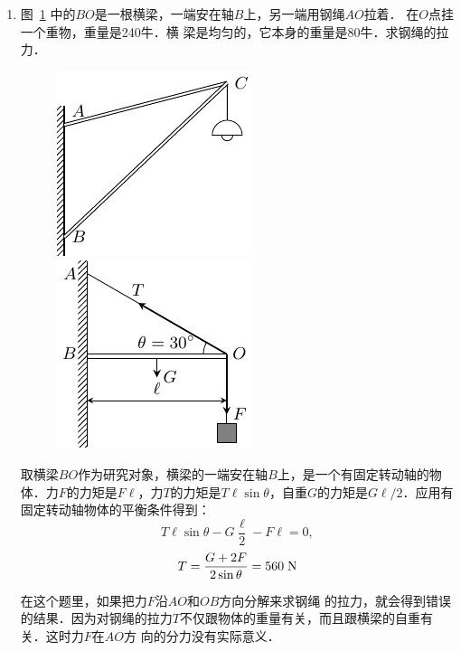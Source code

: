 \begin{enumerate}
\item 图~\ref{fig_A_6-24} 中的$BO$是一根横梁，一端安在轴$B$上，另一端用钢绳$AO$拉着．
在$O$点挂一个重物，重量是240牛．横
梁是均匀的，它本身的重量是80牛．求钢绳的拉力．

\begin{figure}[htbp]
    \centering
    \begin{minipage}[t]{0.4\textwidth}
        \centering
        \includegraphics{fig/A/6-23.pdf}
        \caption{}\label{fig_A_6-23}
    \end{minipage}
    \hfil
    \begin{minipage}[t]{0.4\textwidth}
        \centering
        \includegraphics{fig/A/6-24.pdf}
        \caption{}\label{fig_A_6-24}
    \end{minipage}
\end{figure}



\begin{solution}
    取横梁$BO$作为研究对象，横梁的一端安在轴$B$上，是一个有固定转动轴的物体．力$F$的力矩是$F\ell$，力$T$的力矩是$T\ell\sin\theta$，自重$G$的力矩是$G\ell/2$．应用有固定转动轴物体的平衡条件得到：
\[    T\ell\sin\theta -G\frac{\ell}{2}-F\ell=0,\]
\[T= \frac{G+2F}{2\sin\theta }=560 \;\text{N} \]


在这个题里，如果把力$F$沿$AO$和$OB$方向分解来求钢绳
的拉力，就会得到错误的结果．因为对钢绳的拉力$T$不仅跟物体的重量有关，而且跟横梁的自重有关．这时力$F$在$AO$方
向的分力没有实际意义．
\end{solution}


\end{enumerate}
